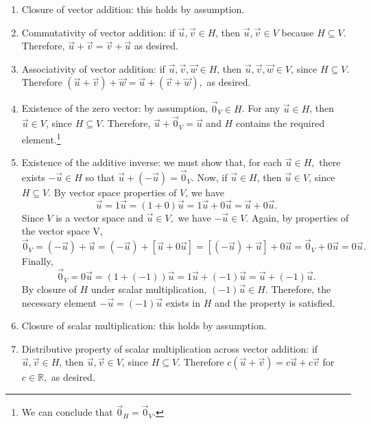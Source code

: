 \documentclass{exam}
\begin{document}
\begin{enumerate}[label=(\alph*)]
    \item Closure of vector addition: this holds by assumption.
    
    \item Commutativity of vector addition: if $\Vec{u}, \Vec{v}\in H$, then $\Vec{u}, \Vec{v}\in V$ because $H\subseteq V$. Therefore, $\Vec{u}+\Vec{v}=\Vec{v}+ \Vec{u}$ as desired. 
    
    \item Associativity of vector addition: if $\Vec{u}, \Vec{v}, \Vec{w}\in H$, then $\Vec{u}, \Vec{v}, \Vec{w}\in V$, since $H\subseteq V$. Therefore $(\Vec{u}+\Vec{v})+\Vec{w}=\Vec{u}+(\Vec{v}+\Vec{w}),$ as desired.
    
    \item Existence of the zero vector: by assumption, $\Vec{0}_V\in H$. For any $\Vec{u}\in H$, then $\Vec{u}\in V$, since $H\subseteq V$. Therefore, $\Vec{u}+\Vec{0}_V=\Vec{u}$ and $H$ contains the required element.\footnote{We can conclude that $\Vec{0}_H=\Vec{0}_V$.} 
    
    \item Existence of the additive inverse: we must show that, for each $\Vec{u}\in H,$ there exists $-\Vec{u}\in H$ so that $\Vec{u}+(-\Vec{u})=\Vec{0}_V$. \newline
    Now, if $\Vec{u}\in H$, then $\Vec{u}\in V$, since $H\subseteq V$. By vector space properties of $V$, we have $$\Vec{u}=1\Vec{u}=(1+0)\Vec{u}=1\Vec{u}+0\Vec{u}=\Vec{u}+0\Vec{u}.$$ 
    Since $V$ is a vector space and $\Vec{u}\in V,$ we have $-\Vec{u}\in V$. Again, by properties of the vector space V, $$\Vec{0}_V=(-\Vec{u})+\Vec{u}=(-\Vec{u})+[\Vec{u}+0\Vec{u}]=[(-\Vec{u})+\Vec{u}]+0\Vec{u}=\Vec{0}_V+0\Vec{u}=0\Vec{u}.$$
    Finally, $$\Vec{0}_V=0\Vec{u}=(1+(-1))\Vec{u}=1\Vec{u}+(-1)\Vec{u}=\Vec{u}+(-1)\Vec{u}.$$
    By closure of $H$ under scalar multiplication, $(-1)\Vec{u}\in H$. Therefore, the necessary element $-\Vec{u}=(-1)\Vec{u}$ exists in $H$ and the property is satisfied. 
    
    \item Closure of scalar multiplication: this holds by assumption.
    
    \item Distributive property of scalar multiplication across vector addition: if $\Vec{u},\Vec{v}\in H$, then $\Vec{u},\Vec{v}\in V$, since $H\subseteq V$. Therefore $c(\Vec{u}+\Vec{v})=c\Vec{u}+c\Vec{v}$ for $c\in\mathbb{R},$ as desired. 
    

\end{enumerate}
\end{document}

